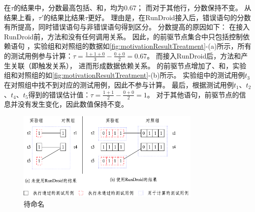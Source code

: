 在$\tau$的结果中，分数最高包括、和，均为0.67；
而对于其他行，分数保持不变。
从结果上看，$\tau'$的结果比结果$\tau$更好。
理由是，在RunDroid接入后，错误语句的分数有所提高，同时错误语句与非错误语句得到区分。
 分数提高的原因如下：
在接入RunDroid前，方法和没有任何调用关系。
因此，的前驱节点集合中只包括控制依赖语句 ，实验组和对照组的数据如\autoref{fig:motivationResultTreatment}-(a)所示，所有的测试用例参与计算：$\tau= \frac{1+1+0	}{3} - \frac{0+0}{2} = 0.67$。
而接入RunDroid后，方法和产生关联（即触发关系），
进而形成数据依赖关系。
的前驱节点增加了、和，实验组和对照组的如\autoref{fig:motivationResultTreatment}-(b)所示。
实验组中的测试用例$t_3$在对照组中找不到对应的测试用例，因此不参与计算。
最后，根据测试用例$t_1$、$t_2$、$t_4$、$t_5$得到的错误估计值：$\tau =  \frac{1+1	}{2} - \frac{0+0}{2} = 1$。
对于其他语句，前驱节点的信息并没有发生变化，因此数值保持不变。


\begin{figure}[!h]
		\begin{center}
	\includegraphics[width=0.8\textwidth]{./Figures/treatment.png}
\end{center}
	\caption{待命名}
	\label{fig:motivationResultTreatment}
\end{figure}

